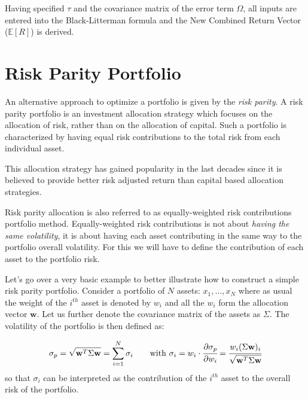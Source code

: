 Having specified $\tau$ and the covariance matrix of the error term $\Omega$, all inputs are entered into the Black-Litterman formula and the New Combined Return Vector ($\mathbb{E}[R]$) is derived. 




\section{Risk Parity Portfolio}
\label{risk-parity-portfolio}

An alternative approach to optimize a portfolio is given by the \emph{risk parity}. A risk parity portfolio is an investment allocation strategy which focuses on the allocation of risk, rather than on the allocation of capital. 
Such a portfolio is characterized by having equal risk contributions to the total risk from each individual asset. 

This allocation strategy has gained popularity in the last decades since it is believed to provide better risk adjusted return than capital based allocation strategies.

Risk parity allocation is also referred to as equally-weighted risk contributions portfolio method. Equally-weighted risk contributions is not about \emph{having the same volatility}, it is about having each asset contributing in the same way to the portfolio overall volatility. For this we will have to define the contribution of each asset to the portfolio risk. 

Let's go over a very basic example to better illustrate how to construct a simple risk parity portfolio. Consider a portfolio of \(N\) assets: \(x_{1}, \ldots, x_N\) where as usual the weight of the $i^{th}$ asset is denoted by \(w_{i}\) and all the \(w_{i}\) form the allocation vector \(\mathbf{w}\). Let us further denote the covariance matrix of the assets as \(\Sigma\). The volatility of the portfolio is then defined as:

\begin{equation} 
\sigma_p={\sqrt {\mathbf{w}^T\Sigma \mathbf{w}}} = \sum_{i=1}^{N}\sigma _{i}\qquad\textrm{with}~\sigma _{i} = w_{i}\cdot \cfrac{\partial\sigma_p}{\partial w_{i}}={\cfrac {w_{i}(\Sigma \mathbf{w})_{i}}{\sqrt {\mathbf{w}^T\Sigma \mathbf{w}}}}
\end{equation}
so that \(\sigma _{i}\) can be interpreted as the contribution of the $i^{th}$ asset to the overall risk of the portfolio.

